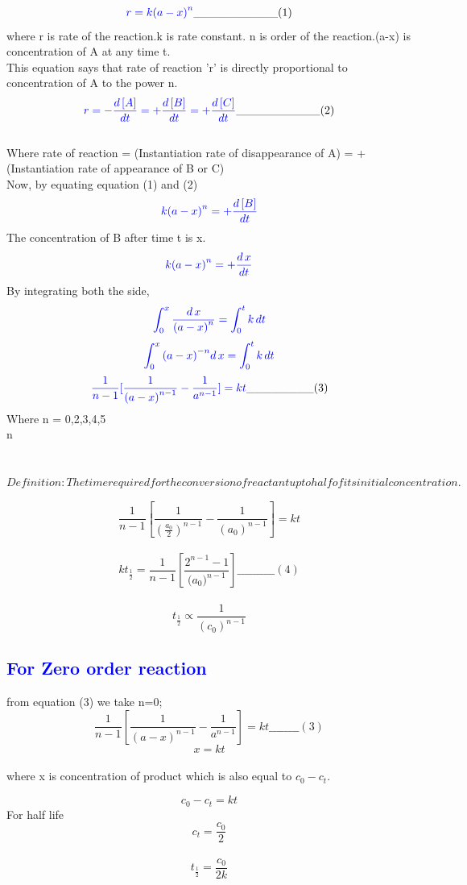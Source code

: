 \documentclass[12pt]{article}
\begin{document}
$$\textcolor{blue}{r=k{(a-x)}^{n}}\_\_\_\_\_\_\_\_\_\_(1)$$
where r is rate of the reaction.k is rate constant. n is order of the reaction.(a-x) is concentration of A at any time t.
\\This equation says that rate of reaction 'r' is directly proportional to concentration of A to the power n.
\\$$  \textcolor{blue}{r=-\frac{d\,[A]}{dt}=+\frac{d\,[B]}{dt}=+\frac{d\,[C]}{dt}}\_\_\_\_\_\_\_\_\_\_(2)$$
\\Where rate of reaction = (Instantiation rate of disappearance of A) = +(Instantiation rate of appearance of B or C)
\\Now, by equating equation (1) and (2)
$$ \textcolor{blue}{k{(a-x)}^{n}=+\frac{d\,[B]}{dt}}$$
The concentration of B after time t is x.
$$  \textcolor{blue}{k{(a-x)}^{n}=+\frac{d\,x}{dt}}$$
By integrating both the side,
$$ \textcolor{blue}{\int_{0}^{x}{\frac{d\,x}{{(a-x)}^{n}}}=\int_{0}^{t}{k\,dt}}$$
$$  \textcolor{blue}{\int_{0}^{x}{{(a-x)}^{-n}{d\,x}}=\int_{0}^{t}{k\,dt}}$$
$$  \textcolor{blue}{\frac{1}{n-1}[\frac{1}{{(a-x)}^{n-1}}-\frac{1}{{a}^{n-1}}]=kt}\_\_\_\_\_\_\_\_(3)$$
Where n = 0,2,3,4,5%
\\n{}
\\\\{}
\\ $ Definition : The time required for the conversion of reactant up to half of its initial concentration.$

$$\frac{1}{n-1}[\frac{1}{{(\frac{a_0}{2})}^{n-1}}-\frac{1}{{(a_0)}^{n-1}}]=kt$$
\\ $$kt_\frac{1}{2} = \frac{1}{n-1}[\frac{{2}^{n-1}-1}{({a_0)}^{n-1}}]\_\_\_\_\_\_\_\_\_\_(4)$$
\\$$t_\frac{1}{2}\propto \frac{1}{{(c_0)}^{n-1}}$$

\subsection{\textcolor{blue}{For Zero order reaction}}

from equation (3) we take n=0;
$$\frac{1}{n-1}[\frac{1}{{(a-x)}^{n-1}}-\frac{1}{{a}^{n-1}}]=kt\_\_\_\_\_\_\_\_(3)$$
$$x = kt$$
\\ where x is concentration of product which is also equal to ${c_0} - {c_t}.$

$$c_0 - c_t = kt$$
For half life 
\\$$c_t = \frac{c_0}{2}$$
\ $$t_\frac{1}{2} = \frac{c_0}{2k}$$
\end{document}
